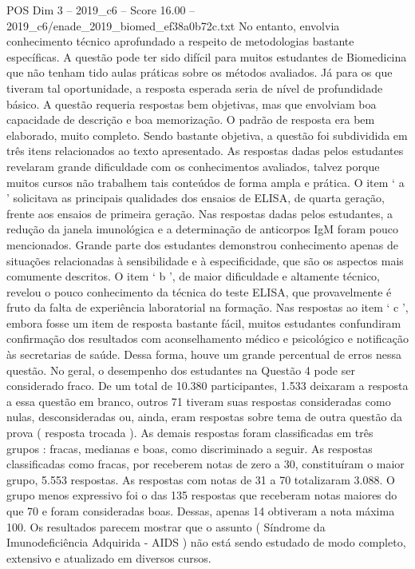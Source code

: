 \begin{textsample}{POS Dim 3 – 2019\_c6 – Score 16.00 – 2019\_c6/enade\_2019\_biomed\_ef38a0b72c.txt}
No entanto, envolvia conhecimento técnico aprofundado a respeito de metodologias bastante específicas.
A questão pode ter sido difícil para muitos estudantes de Biomedicina que não tenham tido aulas práticas sobre os métodos avaliados.
Já para os que tiveram tal oportunidade, a resposta esperada seria de nível de profundidade básico.
A questão requeria respostas bem objetivas, mas que envolviam boa capacidade de descrição e boa memorização.
O padrão de resposta era bem elaborado, muito completo.
Sendo bastante objetiva, a questão foi subdividida em três itens relacionados ao texto apresentado.
As respostas dadas pelos estudantes revelaram grande dificuldade com os conhecimentos avaliados, talvez porque muitos cursos não trabalhem tais conteúdos de forma ampla e prática.
O item ‘ a ’ solicitava as principais qualidades dos ensaios de ELISA, de quarta geração, frente aos ensaios de primeira geração.
Nas respostas dadas pelos estudantes, a redução da janela imunológica e a determinação de anticorpos IgM foram pouco mencionados.
Grande parte dos estudantes demonstrou conhecimento apenas de situações relacionadas à sensibilidade e à especificidade, que são os aspectos mais comumente descritos.
O item ‘ b ’, de maior dificuldade e altamente técnico, revelou o pouco conhecimento da técnica do teste ELISA, que provavelmente é fruto da falta de experiência laboratorial na formação.
Nas respostas ao item ‘ c ’, embora fosse um item de resposta bastante fácil, muitos estudantes confundiram confirmação dos resultados com aconselhamento médico e psicológico e notificação às secretarias de saúde.
Dessa forma, houve um grande percentual de erros nessa questão.
No geral, o desempenho dos estudantes na Questão 4 pode ser considerado fraco.
De um total de 10.380 participantes, 1.533 deixaram a resposta a essa questão em branco, outros 71 tiveram suas respostas consideradas como nulas, desconsideradas ou, ainda, eram respostas sobre tema de outra questão da prova ( resposta trocada ).
As demais respostas foram classificadas em três grupos : fracas, medianas e boas, como discriminado a seguir.
As respostas classificadas como fracas, por receberem notas de zero a 30, constituíram o maior grupo, 5.553 respostas.
As respostas com notas de 31 a 70 totalizaram 3.088.
O grupo menos expressivo foi o das 135 respostas que receberam notas maiores do que 70 e foram consideradas boas.
Dessas, apenas 14 obtiveram a nota máxima 100.
Os resultados parecem mostrar que o assunto ( Síndrome da Imunodeficiência Adquirida - AIDS ) não está sendo estudado de modo completo, extensivo e atualizado em diversos cursos.

\end{textsample}
